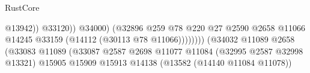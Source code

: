 \begin{lexlean}{RustCore}
\begin{coremodule}
                                                                                  @13942))
                                                                              @33120))
                                                                          @34000)
                                                                        (@32896
                                                                          @259
                                                                          @78
                                                                          @220
                                                                          @27
                                                                          @2590
                                                                          @2658
                                                                          @11066
                                                                          @14245
                                                                          @33159
                                                                          (@14112
                                                                            (@30113
                                                                              @78
                                                                              @11066))))))))
                                                              (@34032
                                                                @11089
                                                                @2658
                                                                (@33083
                                                                  @11089
                                                                  (@33087
                                                                    @2587
                                                                    @2698
                                                                    @11077
                                                                    @11084
                                                                    (@32995 @2587 @32998 @13321)
                                                                    @15905
                                                                    @15909
                                                                    @15913
                                                                    @14138
                                                                    (@13582 (@14140 @11084 @11078))

\end{coremodule}
\end{lexlean}
